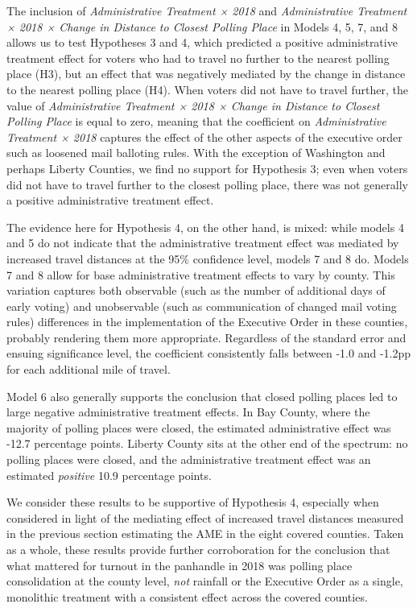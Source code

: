 \documentclass[
  12pt,
]{article}
\begin{document}
The inclusion of \emph{Administrative Treatment × 2018} and \emph{Administrative Treatment × 2018 × Change in Distance to Closest Polling Place} in Models 4, 5, 7, and 8 allows us to test Hypotheses 3 and 4, which predicted a positive administrative treatment effect for voters who had to travel no further to the nearest polling place (H3), but an effect that was negatively mediated by the change in distance to the nearest polling place (H4). When voters did not have to travel further, the value of \emph{Administrative Treatment × 2018 × Change in Distance to Closest Polling Place} is equal to zero, meaning that the coefficient on \emph{Administrative Treatment × 2018} captures the effect of the other aspects of the executive order such as loosened mail balloting rules. With the exception of Washington and perhaps Liberty Counties, we find no support for Hypothesis 3; even when voters did not have to travel further to the closest polling place, there was not generally a positive administrative treatment effect.

The evidence here for Hypothesis 4, on the other hand, is mixed: while models 4 and 5 do not indicate that the administrative treatment effect was mediated by increased travel distances at the 95\% confidence level, models 7 and 8 do. Models 7 and 8 allow for base administrative treatment effects to vary by county. This variation captures both observable (such as the number of additional days of early voting) and unobservable (such as communication of changed mail voting rules) differences in the implementation of the Executive Order in these counties, probably rendering them more appropriate. Regardless of the standard error and ensuing significance level, the coefficient consistently falls between -1.0 and -1.2pp for each additional mile of travel.

Model 6 also generally supports the conclusion that closed polling places led to large negative administrative treatment effects. In Bay County, where the majority of polling places were closed, the estimated administrative effect was -12.7 percentage points. Liberty County sits at the other end of the spectrum: no polling places were closed, and the administrative treatment effect was an estimated \emph{positive} 10.9 percentage points.

We consider these results to be supportive of Hypothesis 4, especially when considered in light of the mediating effect of increased travel distances measured in the previous section estimating the AME in the eight covered counties. Taken as a whole, these results provide further corroboration for the conclusion that what mattered for turnout in the panhandle in 2018 was polling place consolidation at the county level, \emph{not} rainfall or the Executive Order as a single, monolithic treatment with a consistent effect across the covered counties.
\end{document}
